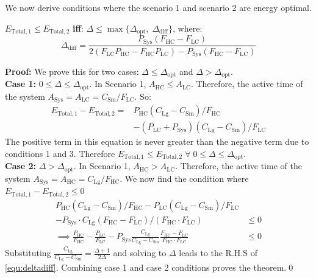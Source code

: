 We now derive conditions where the scenario 1 and scenario 2 are energy optimal. 

\begin{theorem}\label{thm:case1vscase2}
$E_{\mathrm{Total},1}\leq E_{\mathrm{Total},2}$ \textbf{iff}: $\Delta\leq\max\{\Delta_\mathrm{opt},\; \Delta_\mathrm{diff}\}$, where:
\begin{equation}\label{equ:deltadiff}
\Delta_\mathrm{diff}=\frac{P_\mathrm{Sys} (F_\mathrm{HC}-F_\mathrm{LC})}{2 (F_\mathrm{LC}  P_\mathrm{HC} - F_\mathrm{HC} P_\mathrm{LC}) - P_\mathrm{Sys} (F_\mathrm{HC}-F_\mathrm{LC})} 
\end{equation}
\end{theorem}
\noindent\textbf{Proof:} We prove this for two cases: $\Delta\leq\Delta_\mathrm{opt}$ and $\Delta>\Delta_\mathrm{opt}$.\\
\textbf{Case 1:} $0\leq\Delta\leq \Delta_\mathrm{opt}$. In Scenario 1, $A_\mathrm{HC}\leq A_\mathrm{LC}$. Therefore, the active time of the system $A_\mathrm{Sys}=A_\mathrm{LC}=C_\mathrm{Sm}/F_\mathrm{LC}$. So:
\begin{align*}
E_\mathrm{Total, 1}-E_\mathrm{Total, 2}=&P_\mathrm{HC}(C_\mathrm{Lg}-C_\mathrm{Sm})/F_\mathrm{HC} \\& -(P_\mathrm{LC}+P_\mathrm{Sys})(C_\mathrm{Lg}-C_\mathrm{Sm})/F_\mathrm{LC}
\end{align*}
The positive term in this equation is never greater than the negative term due to conditions 1 and 3. Therefore $E_\mathrm{Total, 1}\leq E_\mathrm{Total, 2}\; \forall \; 0\leq\Delta\leq \Delta_\mathrm{opt}$. \\
\textbf{Case 2:} $\Delta> \Delta_\mathrm{opt}$. In Scenario 1, $A_\mathrm{HC}>A_\mathrm{LC}$. Therefore, the active time of the system $A_\mathrm{Sys}=A_\mathrm{HC}=C_\mathrm{Lg}/F_\mathrm{HC}$. We now find the condition where $E_\mathrm{Total, 1}-E_\mathrm{Total, 2}\leq 0$
\begin{align*}
P_\mathrm{HC}(C_\mathrm{Lg}-C_\mathrm{Sm})/F_\mathrm{HC} - P_\mathrm{LC}(C_\mathrm{Lg}-C_\mathrm{Sm})/F_\mathrm{LC}\\
-P_\mathrm{Sys}\cdot C_\mathrm{Lg}(F_\mathrm{HC}-F_\mathrm{LC})/(F_\mathrm{HC}\cdot F_\mathrm{LC})&\leq 0\\ 
\implies \frac{P_\mathrm{HC}}{F_\mathrm{HC}}-\frac{P_\mathrm{LC}}{F_\mathrm{LC}}-P_\mathrm{Sys}\frac{C_\mathrm{Lg}}{{C_\mathrm{Lg}-C_\mathrm{Sm}}}\frac{F_\mathrm{HC}-F_\mathrm{LC}}{F_\mathrm{HC}\cdot F_\mathrm{LC}}&\leq 0
\end{align*}
Substituting $\frac{C_\mathrm{Lg}}{{C_\mathrm{Lg}-C_\mathrm{Sm}}} = \frac{\Delta+1}{2\Delta}$ and solving to $\Delta$ leads to the R.H.S of \eqref{equ:deltadiff}. Combining case 1 and case 2 conditions proves the theorem.\qed

